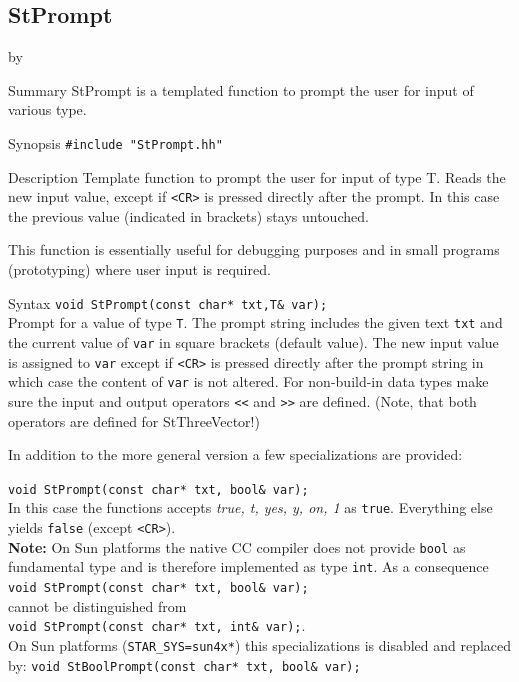 \documentclass[twoside]{article}
\newcommand{\comp}[1]{\texttt{#1}}%
\newcommand{\entrylabel}[1]{\mbox{\textbf{{#1}}}\hfil}%
\newenvironment{entry}
{\begin{list}{}%
    {\renewcommand{\makelabel}{\entrylabel}%
     \setlength{\labelwidth}{90pt}%
     \setlength{\leftmargin}{\labelwidth}
     \advance\leftmargin by \labelsep%
      }%
    }%
  {\end{list}}
\newcommand{\Entrylabel}[1]%
{\raisebox{0pt}[1ex][0pt]{\makebox[\labelwidth][l]%
    {\parbox[t]{\labelwidth}{\hspace{0pt}\textbf{{#1}}}}}}
\newenvironment{Entry}%
{\renewcommand{\entrylabel}{\Entrylabel}\begin{entry}}%
  {\end{entry}}
\begin{document}
\clearpage

%
%
\subsection{StPrompt } \label{ref:StPrompt}
\begin{Entry}
\item[Summary]
    StPrompt is a templated function to prompt the user for input of
    various type.
    
\item[Synopsis]
    \verb+#include "StPrompt.hh"+
    
  
\item[Description]   
  Template function to prompt the user for input of type T.
  Reads the new input value, except if \verb+<CR>+ is 
  pressed directly after the prompt. In this case the
  previous value (indicated in brackets) stays untouched.

  This function is essentially useful for debugging purposes and in small
  programs (prototyping) where user input is required.
  
\item[Syntax]
    \verb+void StPrompt(const char* txt,T& var);+\\
    Prompt for a value of type \comp{T}. The prompt string includes
    the given text \comp{txt} and the current value of \comp{var}
    in square brackets (default value). The new input value is assigned
    to \comp{var} except if \verb+<CR>+ is pressed directly after the prompt
    string in which case the content of \comp{var} is not altered.
    For non-build-in data types make sure the input and output 
    operators \verb+<<+ and \verb+>>+ are defined. (Note, that 
    both operators are defined for StThreeVector!)

    In addition to the more general version a few specializations
    are provided:

    \verb+void StPrompt(const char* txt, bool& var);+\\
    In this case the functions accepts \textit{true, t, yes, y, on, 1}
    as \comp{true}. Everything else yields \comp{false}
    (except \verb+<CR>+).\\
    {\bf Note:} On Sun platforms the native CC compiler does not provide \comp{bool}
    as fundamental type and is therefore implemented as type \comp{int}.
    As a consequence \\
    \verb+void StPrompt(const char* txt, bool& var);+\\
    cannot be distinguished from \\
    \verb+void StPrompt(const char* txt, int& var);+.\\
    On Sun platforms (\comp{STAR\_SYS=sun4x*}) this specializations is
    disabled and replaced by:
    \verb+void StBoolPrompt(const char* txt, bool& var);+\\    


\end{Entry}
\end{document}
